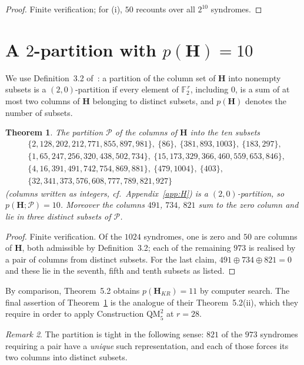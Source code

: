 \documentclass[11pt,a4paper]{article}
\newtheorem{theorem}{Theorem}
\theoremstyle{definition}
\theoremstyle{remark}
\newtheorem{remark}[theorem]{Remark}
\newcommand{\FF}{\mathbb{F}}
\newcommand{\HH}{\boldsymbol{H}}
\begin{document}
\begin{proof}
Finite verification; for (i), $50$ recounts over all $2^{10}$ syndromes.
\end{proof}

\section{A $2$-partition with $p(\HH)=10$}

We use Definition~3.2 of~\cite{DMP2025}: a partition of the column set of
$\HH$ into nonempty subsets is a $(2,0)$-partition if every element of
$\FF_2^{\,r}$, including $0$, is a sum of at most two columns of $\HH$
belonging to distinct subsets, and $p(\HH)$ denotes the number of subsets.

\begin{theorem}\label{thm:part}
The partition $\mathscr P$ of the columns of $\HH$ into the ten subsets
\begin{align*}
&\{2,128,202,212,771,855,897,981\},\ \{86\},\ \{381,893,1003\},\ \{183,297\},\\
&\{1,65,247,256,320,438,502,734\},\ \{15,173,329,366,460,559,653,846\},\\
&\{4,16,391,491,742,754,869,881\},\ \{479,1004\},\ \{403\},\\
&\{32,341,373,576,608,777,789,821,927\}
\end{align*}
(columns written as integers, cf.\ Appendix~\ref{app:H}) is a
$(2,0)$-partition, so $p(\HH;\mathscr P)=10$. Moreover the columns
$491$, $734$, $821$ sum to the zero column and lie in three distinct subsets
of $\mathscr P$.
\end{theorem}

\begin{proof}
Finite verification. Of the $1024$ syndromes, one is zero and $50$ are columns
of $\HH$, both admissible by Definition~3.2; each of the remaining $973$ is
realised by a pair of columns from distinct subsets. For the last claim,
$491\oplus734\oplus821=0$ and these lie in the seventh, fifth and tenth subsets
as listed.
\end{proof}

By comparison, \cite{DMP2025} Theorem~5.2 obtains $p(\HH_{KR})=11$ by computer
search. The final assertion of Theorem~\ref{thm:part} is the analogue of their
Theorem~5.2(ii), which they require in order to apply Construction
$\mathrm{QM}_5^2$ at $r=28$.

\begin{remark}
The partition is tight in the following sense: $821$ of the $973$ syndromes
requiring a pair have a \emph{unique} such representation, and each of those
forces its two columns into distinct subsets.
\end{remark}
\end{document}
